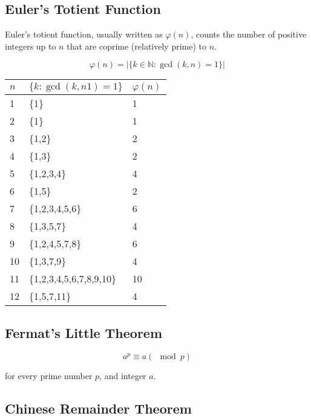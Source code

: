 \documentclass[11pt]{article}
\theoremstyle{plain}
\theoremstyle{definition}
\begin{document}
\subsection*{Euler's Totient Function}

Euler's totient function, usually written as $\varphi(n)$, counts the number of positive integers up to $n$ that are coprime (relatively prime) to $n$.

$$ \varphi(n) = |\{k \in \mathbb{N} : \gcd(k, n) = 1\}| $$

\begin{center}
  \begin{tabular}{l l l}
    $n$ & $\{k : \gcd(k, n1) = 1\}$ & $\varphi(n)$ \\
    \hline
    1  & \{1\}                    & 1 \\
    2  & \{1\}                    & 1 \\
    3  & \{1,2\}                  & 2 \\
    4  & \{1,3\}                  & 2 \\
    5  & \{1,2,3,4\}              & 4 \\
    6  & \{1,5\}                  & 2 \\
    7  & \{1,2,3,4,5,6\}          & 6 \\
    8  & \{1,3,5,7\}              & 4 \\
    9  & \{1,2,4,5,7,8\}          & 6 \\
    10 & \{1,3,7,9\}              & 4 \\
    11 & \{1,2,3,4,5,6,7,8,9,10\} & 10 \\
    12 & \{1,5,7,11\}             & 4 \\
  \end{tabular}
\end{center}

\subsection*{Fermat's Little Theorem}

$$
a^p \equiv a (\mod p)
$$

for every prime number $p$, and integer $a$.

\subsection*{Chinese Remainder Theorem}
\end{document}
